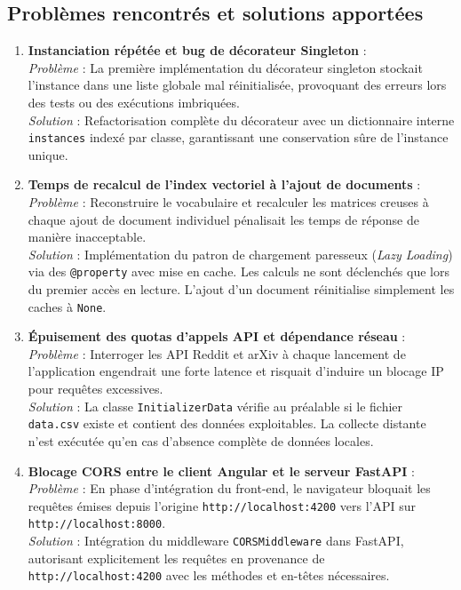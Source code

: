 \documentclass[12pt,a4paper]{article}
\begin{document}
\newpage

\subsection{Problèmes rencontrés et solutions apportées}

\begin{enumerate}[leftmargin=*, label=\textbf{P\arabic*.}]
    \item \textbf{Instanciation répétée et bug de décorateur Singleton} :\\
    \textit{Problème} : La première implémentation du décorateur singleton stockait l'instance dans une liste globale mal réinitialisée, provoquant des erreurs lors des tests ou des exécutions imbriquées.\\
    \textit{Solution} : Refactorisation complète du décorateur avec un dictionnaire interne \texttt{instances} indexé par classe, garantissant une conservation sûre de l'instance unique.
    
    \item \textbf{Temps de recalcul de l'index vectoriel à l'ajout de documents} :\\
    \textit{Problème} : Reconstruire le vocabulaire et recalculer les matrices creuses à chaque ajout de document individuel pénalisait les temps de réponse de manière inacceptable.\\
    \textit{Solution} : Implémentation du patron de chargement paresseux (\textit{Lazy Loading}) via des \texttt{@property} avec mise en cache. Les calculs ne sont déclenchés que lors du premier accès en lecture. L'ajout d'un document réinitialise simplement les caches à \texttt{None}.

    \item \textbf{Épuisement des quotas d'appels API et dépendance réseau} :\\
    \textit{Problème} : Interroger les API Reddit et arXiv à chaque lancement de l'application engendrait une forte latence et risquait d'induire un blocage IP pour requêtes excessives.\\
    \textit{Solution} : La classe \texttt{InitializerData} vérifie au préalable si le fichier \texttt{data.csv} existe et contient des données exploitables. La collecte distante n'est exécutée qu'en cas d'absence complète de données locales.

    \item \textbf{Blocage CORS entre le client Angular et le serveur FastAPI} :\\
    \textit{Problème} : En phase d'intégration du front-end, le navigateur bloquait les requêtes émises depuis l'origine \texttt{http://localhost:4200} vers l'API sur \texttt{http://localhost:8000}.\\
    \textit{Solution} : Intégration du middleware \texttt{CORSMiddleware} dans FastAPI, autorisant explicitement les requêtes en provenance de \texttt{http://localhost:4200} avec les méthodes et en-têtes nécessaires.


\end{enumerate}
\end{document}
